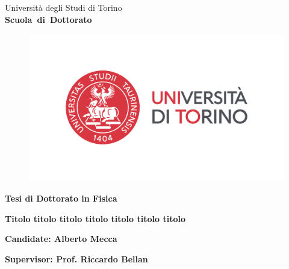 \begin{titlepage}

\begin{center}
\begin{large}
Universit\`a degli Studi di Torino \\
{\bf Scuola~di~Dottorato}
\end{large}
\end{center}
\hrulefill

\vspace{-0.5cm}
\begin{figure}[h]
  \centering
  \includegraphics[width=.8\textwidth]{pictures/LogoUnito_Orizzontale_Colore_resize30percent.png}
\end{figure}

\vspace{-1cm}
\begin{center}
\begin{Large}
{\bf Tesi di Dottorato in Fisica}
\end{Large}
\end{center}

\vspace{2cm}
\LARGE{\bf Titolo titolo titolo titolo titolo titolo titolo}

\vspace*{\fill}
\large{\bf Candidate: Alberto Mecca}

\vspace{1cm}
\large{\bf Supervisor: Prof. Riccardo Bellan}

\end{titlepage}

